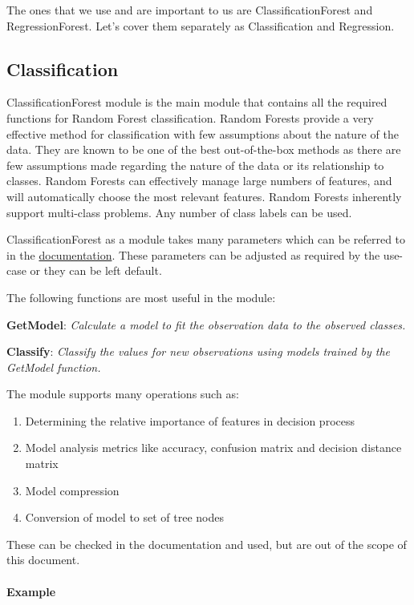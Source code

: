 The ones that we use and are important to us are ClassificationForest and RegressionForest. Let's cover them separately as Classification and Regression.

\subsection{Classification}

ClassificationForest module is the main module that contains all the required functions for Random Forest classification. Random Forests provide a very effective method for classification with few assumptions about the nature of the data. They are known to be one of the best out-of-the-box methods as there are few assumptions made regarding the nature of the data or its relationship to classes. Random Forests can effectively manage large numbers of features, and will automatically choose the most relevant features. Random Forests inherently support multi-class problems. Any number of class labels can be used.

ClassificationForest as a module takes many parameters which can be referred to in the \href{https://cdn.hpccsystems.com/pdf/ml/LearningTrees.pdf}{documentation}. These parameters can be adjusted as required by the use-case or they can be left default. 

The following functions are most useful in the module:

\textbf{GetModel}: \textit{Calculate a model to fit the observation data to the observed classes.}

\textbf{Classify}: \textit{Classify the values for new observations using models trained by the GetModel function.}

The module supports many operations such as: 

\begin{enumerate}
    \item Determining the relative importance of features in decision process
    \item Model analysis metrics like accuracy, confusion matrix and decision distance matrix
    \item Model compression
    \item Conversion of model to set of tree nodes
\end{enumerate}

These can be checked in the documentation and used, but are out of the scope of this document.

\paragraph{Example}


